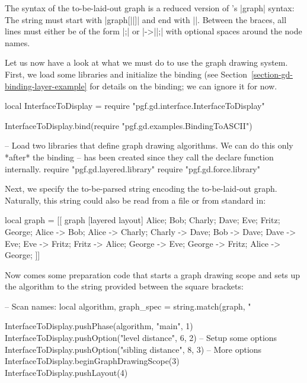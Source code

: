 The syntax of the to-be-laid-out graph is a reduced version of
\tikzname's |graph| syntax: The string must start with
|graph[||]{| and end with |}|. Between the
braces, all lines must either be of the form |;| or
|->||;| with optional spaces around the node
names.

Let us now have a look at what we must do to use the graph drawing
system. First, we load some libraries and initialize the binding (see
Section~\ref{section-gd-binding-layer-example} for details on the
binding; we can ignore it for now.

\begin{codeexample}
local InterfaceToDisplay = require "pgf.gd.interface.InterfaceToDisplay"

InterfaceToDisplay.bind(require "pgf.gd.examples.BindingToASCII")

-- Load two libraries that define graph drawing algorithms. We can do this only *after* the binding
-- has been created since they call the declare function internally.
require "pgf.gd.layered.library"
require "pgf.gd.force.library"
\end{codeexample}

Next, we specify the to-be-parsed string encoding the to-be-laid-out
graph. Naturally, this string could also be read from a file or from
standard in:

\begin{codeexample}
local graph = [[
graph [layered layout] {
  Alice;
  Bob;
  Charly;
  Dave;
  Eve;
  Fritz;
  George;
  Alice -> Bob;
  Alice -> Charly;
  Charly -> Dave;
  Bob -> Dave;
  Dave -> Eve;
  Eve -> Fritz;
  Fritz -> Alice;
  George -> Eve;
  George -> Fritz;
  Alice -> George;
}  
]]  
\end{codeexample}

Now comes some preparation code that starts a graph drawing scope and
sets up the algorithm to the string provided between the square
brackets:

\begin{codeexample}
-- Scan names:
local algorithm, graph_spec = string.match(graph, "%
  
InterfaceToDisplay.pushPhase(algorithm, "main", 1)
InterfaceToDisplay.pushOption("level distance", 6, 2)    -- Setup some options
InterfaceToDisplay.pushOption("sibling distance", 8, 3) -- More options
InterfaceToDisplay.beginGraphDrawingScope(3)
InterfaceToDisplay.pushLayout(4) 
\end{codeexample}

